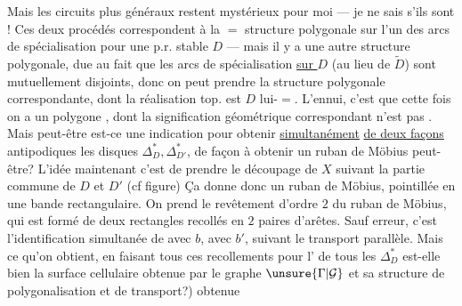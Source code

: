 Mais les circuits plus généraux restent mystérieux pour moi --- je ne sais s'ils sont !
Ces deux procédés correspondent à la $=$ structure polygonale sur l'un des arcs de spécialisation  pour une p.r. stable $D$ --- mais il y a une autre structure polygonale, due au fait que les  arcs de spécialisation \uline{sur $D$} (au lieu de $\widetilde D$) sont mutuellement disjoints, donc on peut prendre la structure polygonale correspondante, dont la réalisation top. est  $D$ lui-$=$. L'ennui, c'est que cette fois on a un polygone   , dont la signification géométrique  correspondant n'est pas . Mais peut-être est-ce une indication pour obtenir \uline{simultanément} \uline{de deux façons} antipodiques les disques $\Delta_D^*,\Delta_{D'}^*$, de façon à obtenir un ruban de Möbius peut-être?
L'idée maintenant c'est de prendre le découpage de $X$ suivant la partie commune de $D$ et $D'$ (cf figure)
Ça donne donc un ruban de Möbius,   pointillée en une bande rectangulaire. On prend le revêtement   d'ordre $2$ du ruban de Möbius,  qui est formé de deux rectangles recollés en $2$ paires d'arêtes. Sauf erreur, c'est l'identification  simultanée de  avec $b$,   avec $b'$, suivant le transport parallèle. Mais ce qu'on obtient, en faisant tous ces recollements pour l' de tous les $\Delta_D^*$ est-elle bien la surface cellulaire obtenue par le graphe $\unsure{\Gamma|\mathcal G}$ et sa structure de polygonalisation et de transport?) obtenue
